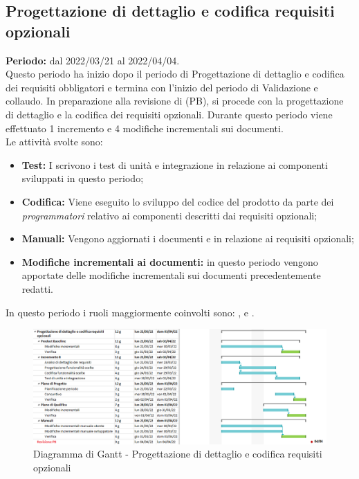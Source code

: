 \subsection{Progettazione di dettaglio e codifica requisiti opzionali} \label{subsection:pianificazione_requisiti_opzionali}
\textbf{Periodo:} dal 2022/03/21 al 2022/04/04.
\bigskip
\\Questo periodo ha inizio dopo il periodo di Progettazione di dettaglio e codifica dei requisiti obbligatori e termina con l'inizio del periodo di Validazione e collaudo.
In preparazione alla revisione di \PB{} (PB\glo{}), si procede con la progettazione di dettaglio e la codifica dei requisiti opzionali.
Durante questo periodo viene effettuato 1 incremento e 4 modifiche incrementali sui documenti. 
\\Le attività svolte sono:
\begin{itemize}
  \item \textbf{Test:} I \roleProgrammerLow{} scrivono i test di unità e integrazione in relazione ai componenti sviluppati in questo periodo;
  \item \textbf{Codifica:} Viene eseguito lo sviluppo del codice del prodotto da parte dei \textit{programmatori} relativo ai componenti descritti dai requisiti opzionali;
  \item \textbf{Manuali:} Vengono aggiornati i documenti \docNameVersionMU{} e \docNameVersionMS{} in relazione ai requisiti opzionali;
  \item \textbf{Modifiche incrementali ai documenti:} in questo periodo vengono apportate delle modifiche incrementali sui documenti precedentemente redatti.
 \end{itemize}
 In questo periodo i ruoli maggiormente coinvolti sono: \roleDesignerLow{}, \roleProgrammerLow{} e \roleVerifierLow{}.
 \bigskip
 \begin{figure}[H]
  \centering
   \includegraphics[scale=0.56]{immagini/prog_requisiti_opzionali.png}
   \caption{Diagramma di Gantt - Progettazione di dettaglio e codifica requisiti opzionali}
  \end{figure}
  \pagebreak

